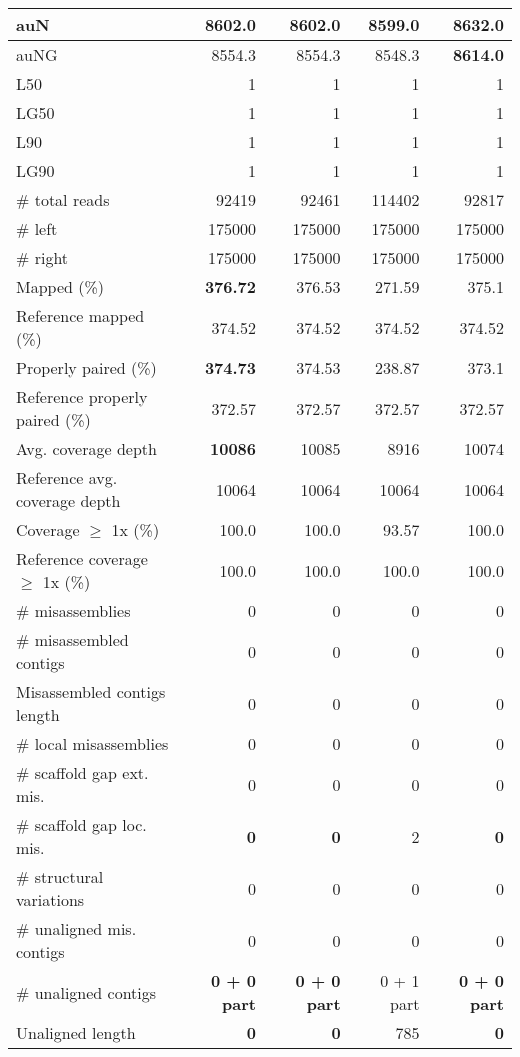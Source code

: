 \documentclass[12pt,a4paper]{article}
\begin{document}
\begin{table}[ht]
\begin{center}
\begin{tabular}{|l*{4}{|r}|}
auN & 8602.0 & 8602.0 & 8599.0 & {\bf 8632.0} \\ \hline
auNG & 8554.3 & 8554.3 & 8548.3 & {\bf 8614.0} \\ \hline
L50 & 1 & 1 & 1 & 1 \\ \hline
LG50 & 1 & 1 & 1 & 1 \\ \hline
L90 & 1 & 1 & 1 & 1 \\ \hline
LG90 & 1 & 1 & 1 & 1 \\ \hline
\# total reads & 92419 & 92461 & 114402 & 92817 \\ \hline
\# left & 175000 & 175000 & 175000 & 175000 \\ \hline
\# right & 175000 & 175000 & 175000 & 175000 \\ \hline
Mapped (\%) & {\bf 376.72} & 376.53 & 271.59 & 375.1 \\ \hline
Reference mapped (\%) & 374.52 & 374.52 & 374.52 & 374.52 \\ \hline
Properly paired (\%) & {\bf 374.73} & 374.53 & 238.87 & 373.1 \\ \hline
Reference properly paired (\%) & 372.57 & 372.57 & 372.57 & 372.57 \\ \hline
Avg. coverage depth & {\bf 10086} & 10085 & 8916 & 10074 \\ \hline
Reference avg. coverage depth & 10064 & 10064 & 10064 & 10064 \\ \hline
Coverage $\geq$ 1x (\%) & 100.0 & 100.0 & 93.57 & 100.0 \\ \hline
Reference coverage $\geq$ 1x (\%) & 100.0 & 100.0 & 100.0 & 100.0 \\ \hline
\# misassemblies & 0 & 0 & 0 & 0 \\ \hline
\# misassembled contigs & 0 & 0 & 0 & 0 \\ \hline
Misassembled contigs length & 0 & 0 & 0 & 0 \\ \hline
\# local misassemblies & 0 & 0 & 0 & 0 \\ \hline
\# scaffold gap ext. mis. & 0 & 0 & 0 & 0 \\ \hline
\# scaffold gap loc. mis. & {\bf 0} & {\bf 0} & 2 & {\bf 0} \\ \hline
\# structural variations & 0 & 0 & 0 & 0 \\ \hline
\# unaligned mis. contigs & 0 & 0 & 0 & 0 \\ \hline
\# unaligned contigs & {\bf 0 + 0 part} & {\bf 0 + 0 part} & 0 + 1 part & {\bf 0 + 0 part} \\ \hline
Unaligned length & {\bf 0} & {\bf 0} & 785 & {\bf 0} \\ \hline

\end{tabular}
\end{center}
\end{table}
\end{document}
